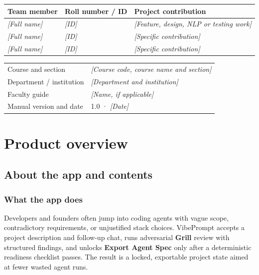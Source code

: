 \documentclass[11pt,a4paper]{article}
\newcommand{\placeholder}[1]{\textit{[#1]}}
\newcommand{\appname}{VibePrompt}
\begin{document}
\vspace{0.8em}
\begin{tabularx}{\textwidth}{@{}Y L{3.2cm} Y@{}}
\toprule
\textbf{Team member} & \textbf{Roll number / ID} & \textbf{Project contribution} \\
\midrule
\placeholder{Full name} & \placeholder{ID} & \placeholder{Feature, design, NLP or testing work} \\
\placeholder{Full name} & \placeholder{ID} & \placeholder{Specific contribution} \\
\placeholder{Full name} & \placeholder{ID} & \placeholder{Specific contribution} \\
\bottomrule
\end{tabularx}

\vspace{0.8em}
\begin{tabularx}{\textwidth}{@{}L{4.2cm}Y@{}}
\toprule
Course and section & \placeholder{Course code, course name and section} \\
Department / institution & \placeholder{Department and institution} \\
Faculty guide & \placeholder{Name, if applicable} \\
Manual version and date & 1.0 · \placeholder{Date} \\
\bottomrule
\end{tabularx}

\newpage

\section*{Product overview}

\subsection*{About the app and contents}
\subsubsection*{What the app does}
Developers and founders often jump into coding agents with vague scope,
contradictory requirements, or unjustified stack choices. \appname{} accepts a
project description and follow-up chat, runs adversarial \textbf{Grill} review
with structured findings, and unlocks \textbf{Export Agent Spec} only after a
deterministic readiness checklist passes. The result is a locked, exportable
project state aimed at fewer wasted agent runs.
\end{document}
